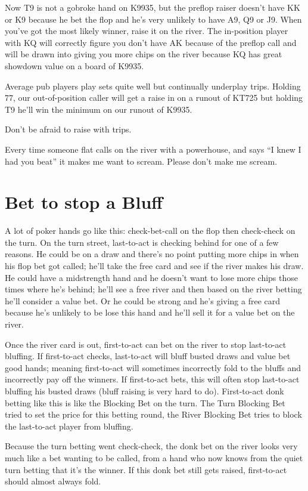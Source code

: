 Now T9 is not a gobroke hand on K9935, but the preflop raiser doesn't
have KK or K9 because he bet the flop and he's very unlikely to have
A9, Q9 or J9. When you've got the most likely winner, raise it on
the river. The in-position player with KQ will correctly figure you
don't have AK because of the preflop call and will be drawn into
giving you more chips on the river because KQ has great showdown value
on a board of K9935.

Average pub players play sets quite well but continually underplay
trips. Holding 77, our out-of-position caller will get a raise in on a
runout of KT725 but holding T9 he'll win the minimum on our runout of
K9935.

Don't be afraid to raise with trips.

Every time someone flat calls on the river with a powerhouse, and
says ``I knew I had you beat'' it makes me want to scream. Please
don't make me scream.

\section{Bet to stop a Bluff}

A lot of poker hands go like this: check-bet-call on the flop
then check-check on the turn. On the turn street, last-to-act
is checking behind for one of a few reasons. He could be on a draw
and there's no point putting more chips in when his flop bet got
called; he'll take the free card and see if the river makes his draw.
He could have a midstrength hand and he doesn't want to lose more chips
those times where he's behind; he'll see a free river and then based
on the river betting he'll consider a value bet. Or he could be
strong and he's giving a free card because he's unlikely to be lose
this hand and he'll sell it for a value bet on the river.

Once the river card is out, first-to-act can bet on the river
to stop last-to-act bluffing. If first-to-act checks, last-to-act
will bluff busted draws and value bet good hands; meaning first-to-act
will sometimes incorrectly fold to the bluffs and incorrectly pay
off the winners. If first-to-act bets, this will often
stop last-to-act bluffing his busted draws (bluff raising is
very hard to do). First-to-act donk betting like this is like
the Blocking Bet on the turn. The Turn Blocking Bet tried to set
the price for this betting round, the River Blocking Bet tries
to block the last-to-act player from bluffing.

Because the turn betting went check-check, the donk bet
on the river looks very much like a bet wanting to be called,
from a hand who now knows from the quiet turn betting that it's
the winner. If this donk bet still gets raised, first-to-act
should almost always fold.

